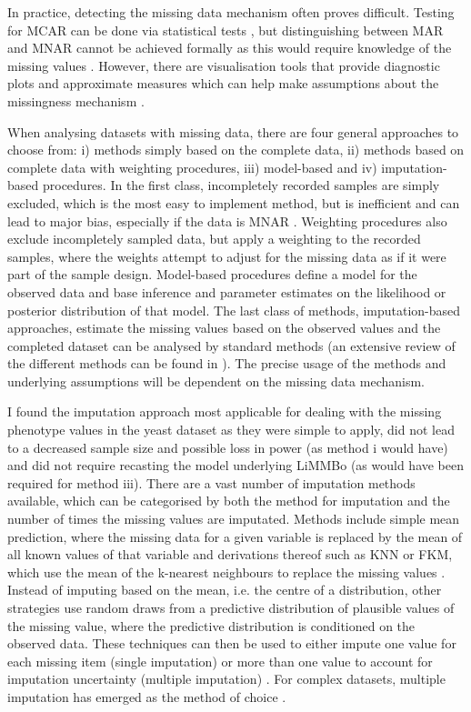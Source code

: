 In practice, detecting the missing data mechanism often proves difficult. Testing for MCAR can be done via statistical tests \citep{Little1988}, but distinguishing between MAR and MNAR cannot be achieved formally as this would require knowledge of the missing values \citep{Little2002,vanBuuren2011}. However, there are visualisation tools that provide diagnostic plots and approximate measures which can help make assumptions about the missingness mechanism \citep{Templ2012,Garson2015}. 

When analysing datasets with missing data, there are four general approaches to choose from:  i) methods simply based on the complete data, ii) methods based on complete data with weighting procedures, iii) model-based and iv) imputation-based procedures. In the first class, incompletely recorded samples are simply excluded, which is the most easy to implement method, but is inefficient and can lead to major bias, especially if the data is MNAR \citep{Little2002}. Weighting procedures also exclude incompletely sampled data, but apply a weighting to the recorded samples, where the weights attempt to adjust for the missing data as if it were part of the sample design. Model-based procedures define a model for the observed data and base inference and parameter estimates on the likelihood or posterior distribution of that model. The last class of methods, imputation-based approaches, estimate the missing values based on the observed values and the completed dataset can be analysed by standard methods (an extensive review of the different methods can be found in \citep{Little2002}). The precise usage of the methods and underlying assumptions will be dependent on the missing data mechanism. 

I found the imputation approach most applicable for dealing with the missing phenotype values in the yeast dataset as they were simple to apply, did not lead to a decreased sample size and possible loss in power (as method i would have) and did not require recasting the model underlying LiMMBo (as would have been required for method iii). There are a vast number of imputation methods available, which can be categorised by both the method for imputation and the number of times the missing values are imputated. Methods include simple mean prediction, where the missing data for a given variable is replaced by the mean of all known values of that variable and derivations thereof such as KNN or FKM, which use the mean of the k-nearest neighbours to replace the missing values \citep{Troyanskaya2001,Li2004}. Instead of imputing based on the mean, i.e. the centre of a distribution, other strategies use random draws from a predictive distribution of plausible values of the missing value, where the predictive distribution is conditioned on the observed data. These techniques can then be used to either impute one value for each missing item (single imputation) or more than one value to account for imputation uncertainty (multiple imputation) \citep{Little2002}. For complex datasets, multiple imputation has emerged as the method of choice \citep{Rubin1987,Schafer1997}. 

